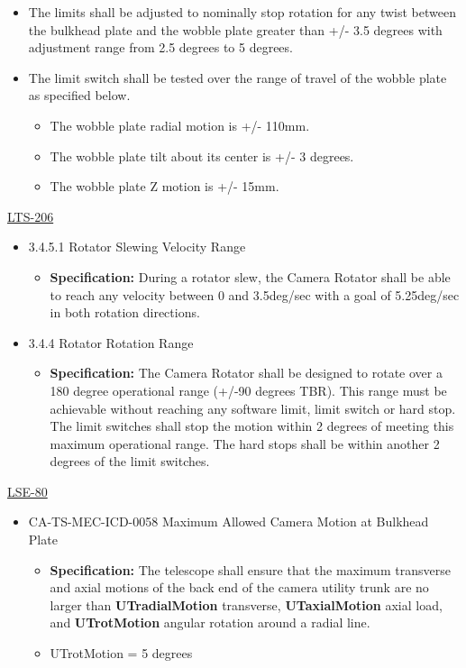 \documentclass[SE,authoryear,toc]{lsstdoc}
\begin{document}
\begin{itemize}
\item
  The limits shall be adjusted to nominally stop rotation for any twist
  between the bulkhead plate and the wobble plate greater than +/- 3.5
  degrees with adjustment range from 2.5 degrees to 5 degrees.
\item
  The limit switch shall be tested over the range of travel of the
  wobble plate as specified below.

  \begin{itemize}
  \item
    The wobble plate radial motion is +/- 110mm.
  \item
    The wobble plate tilt about its center is +/- 3 degrees.
  \item
    The wobble plate Z motion is +/- 15mm.
  \end{itemize}
\end{itemize}

\underline{LTS-206}

\begin{itemize}
\item
  3.4.5.1 Rotator Slewing Velocity Range

  \begin{itemize}
  \item
    \textbf{Specification:} During a rotator slew, the Camera Rotator
    shall be able to reach any velocity between 0 and 3.5deg/sec with a
    goal of 5.25deg/sec in both rotation directions.
  \end{itemize}
\item
  3.4.4 Rotator Rotation Range

  \begin{itemize}
  \item
    \textbf{Specification:} The Camera Rotator shall be designed to
    rotate over a 180 degree operational range (+/-90 degrees TBR). This
    range must be achievable without reaching any software limit, limit
    switch or hard stop. The limit switches shall stop the motion within
    2 degrees of meeting this maximum operational range. The hard stops
    shall be within another 2 degrees of the limit switches.
  \end{itemize}
\end{itemize}

\underline{LSE-80}

\begin{itemize}
\item
  CA-TS-MEC-ICD-0058 Maximum Allowed Camera Motion at Bulkhead Plate

  \begin{itemize}
  \item
    \textbf{Specification:} The telescope shall ensure that the maximum
    transverse and axial motions of the back end of the camera utility
    trunk are no larger than \textbf{UTradialMotion} transverse,
    \textbf{UTaxialMotion} axial load, and \textbf{UTrotMotion} angular
    rotation around a radial line.
  \item
    UTrotMotion = 5 degrees
  \end{itemize}
\end{itemize}
\end{document}
